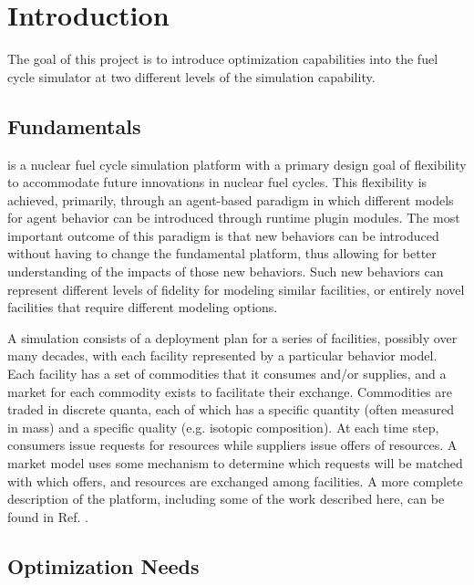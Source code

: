 
\section{Introduction}

The goal of this project is to introduce optimization capabilities into the
\Cyclus{} fuel cycle simulator at two different levels of the simulation
capability.  

\subsection{\Cyclus{} Fundamentals}

\Cyclus{} is a nuclear fuel cycle simulation platform with a primary design
goal of flexibility to accommodate future innovations in nuclear fuel cycles.
This flexibility is achieved, primarily, through an agent-based paradigm in
which different models for agent behavior can be introduced through runtime
plugin modules.  The most important outcome of this paradigm is that new
behaviors can be introduced without having to change the fundamental platform,
thus allowing for better understanding of the impacts of those new behaviors.
Such new behaviors can represent different levels of fidelity for modeling
similar facilities, or entirely novel facilities that require different
modeling options.

A \Cyclus{} simulation consists of a deployment plan for a series of
facilities, possibly over many decades, with each facility represented by a
particular behavior model.  Each facility has a set of commodities that it
consumes and/or supplies, and a market for each commodity exists to facilitate
their exchange.  Commodities are traded in discrete quanta,
each of which has a specific quantity (often measured in mass) and a specific
quality (e.g. isotopic composition).  At each time step, consumers issue
requests for resources while suppliers issue offers of resources. A market
model uses some mechanism to determine which requests will be matched with
which offers, and resources are exchanged among facilities.  A more complete
description of the \Cyclus{} platform, including some of the work described
here, can be found in Ref. .

\subsection{Optimization Needs}

